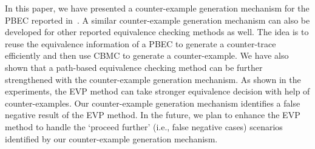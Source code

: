 In this paper, we have presented a counter-example generation mechanism for the
PBEC reported in~\cite{Chouksey18}.  A similar counter-example generation
mechanism can also be developed for other reported equivalence checking methods
as well. The idea is to reuse the equivalence information of a PBEC 
to generate a counter-trace efficiently and then use CBMC to generate
a counter-example. We have also shown that a path-based equivalence
checking method can be further strengthened with the counter-example generation
mechanism. As shown in the experiments, the EVP method can take stronger equivalence
decision with help of counter-examples. Our counter-example generation mechanism
identifies a false negative result of the EVP method. In the future, we plan to
enhance the EVP method to handle the `proceed further' (i.e., false
negative cases) scenarios identified by our counter-example generation
mechanism.
